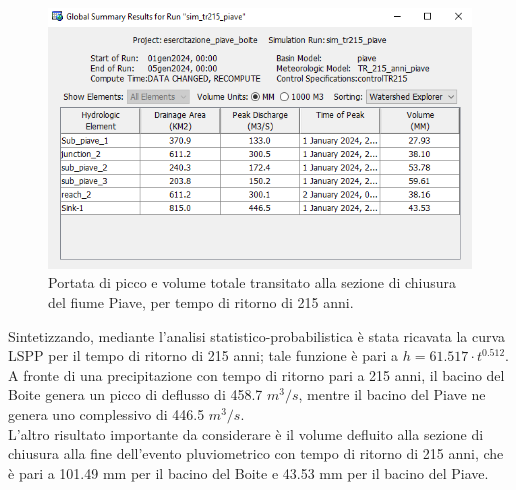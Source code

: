 \begin{figure}[htb] \centering
\includegraphics[scale=0.6]{immagini/risul_piave_215.PNG}
\caption{Portata di picco e volume totale transitato alla sezione di chiusura del fiume Piave, per tempo di ritorno di 215 anni.}
\label{figure:risul_piave_215}
\end{figure}

Sintetizzando, mediante l'analisi statistico-probabilistica è stata ricavata la curva LSPP per il tempo di ritorno di 215 anni; tale funzione è pari a $h=61.517 \cdot t ^{0.512}$.\\
A fronte di una precipitazione con tempo di ritorno pari a 215 anni, il bacino del Boite genera un picco di deflusso di 458.7 $m^3/s$, mentre il bacino del Piave ne genera uno complessivo di 446.5 $m^3/s$.\\
L'altro risultato importante da considerare è il volume defluito alla sezione di chiusura alla fine dell'evento pluviometrico con tempo di ritorno di 215 anni, che è pari a 101.49 mm per il bacino del Boite e 43.53 mm per il bacino del Piave.